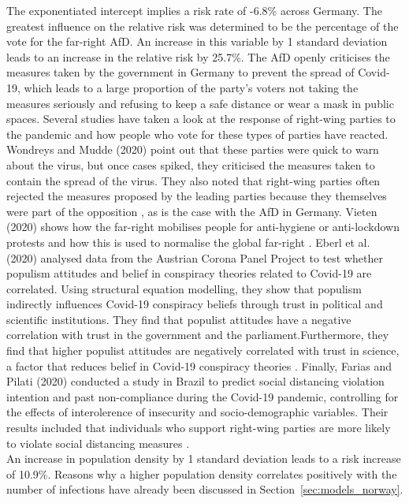 The exponentiated intercept implies a risk rate of -6.8\% across Germany. The greatest influence on the relative risk was determined to be the percentage of the vote for the far-right AfD. An increase in this variable by 1 standard deviation leads to an increase in the relative risk by 25.7\%. The AfD openly criticises the measures taken by the government in Germany to prevent the spread of Covid-19, which leads to a large proportion of the party's voters not taking the measures seriously and refusing to keep a safe distance or wear a mask in public spaces. Several studies have taken a look at the response of right-wing parties to the pandemic and how people who vote for these types of parties have reacted. Wondreys and Mudde (2020) point out that these parties were quick to warn about the virus, but once cases spiked, they criticised the measures taken to contain the spread of the virus. They also noted that right-wing parties often rejected the measures proposed by the leading parties because they themselves were part of the opposition \autocite[][]{wondreys2020victims}, as is the case with the AfD in Germany. Vieten (2020) shows how the far-right mobilises people for anti-hygiene or anti-lockdown protests and how this is used to normalise the global far-right \autocite[][]{vieten2020new}. Eberl et al. (2020) analysed data from the Austrian Corona Panel Project to test whether populism attitudes and belief in conspiracy theories related to Covid-19 are correlated. Using structural equation modelling, they show that populism indirectly influences Covid-19 conspiracy beliefs through trust in political and scientific institutions. They find that populist attitudes have a negative correlation with trust in the government and the parliament.Furthermore, they find that higher populist attitudes are negatively correlated with trust in science, a factor that reduces belief in Covid-19 conspiracy theories \autocite[][]{eberl2020populism}. Finally, Farias and Pilati (2020) conducted a study in Brazil to predict social distancing violation intention and past non-compliance during the Covid-19 pandemic, controlling for the effects of interolerence of insecurity and socio-demographic variables. Their results included that individuals who support right-wing parties are more likely to violate social distancing measures \autocite[][]{farias2020violating}. \\
An increase in population density by 1 standard deviation leads to a risk increase of 10.9\%. Reasons why a higher population density correlates positively with the number of infections have already been discussed in Section~\ref{sec:models_norway}. \\
